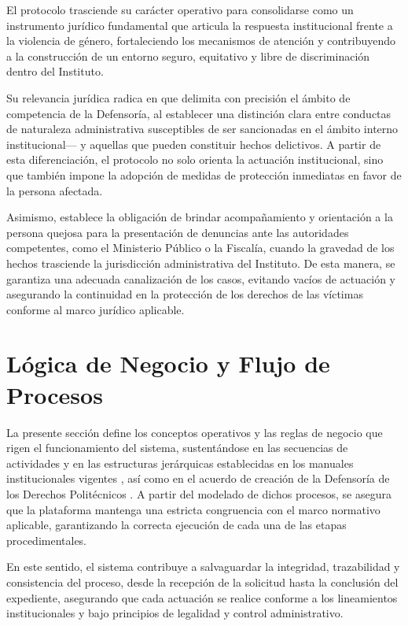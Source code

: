 El protocolo trasciende su carácter operativo para consolidarse como un instrumento jurídico fundamental que articula la respuesta institucional frente a la violencia de género, fortaleciendo los mecanismos de atención y contribuyendo a la construcción de un entorno seguro, equitativo y libre de discriminación dentro del Instituto.

Su relevancia jurídica radica en que delimita con precisión el ámbito de competencia de la Defensoría, al establecer una distinción clara entre conductas de naturaleza administrativa susceptibles de ser sancionadas en el ámbito interno institucional— y aquellas que pueden constituir hechos delictivos. A partir de esta diferenciación, el protocolo no solo orienta la actuación institucional, sino que también impone la adopción de medidas de protección inmediatas en favor de la persona afectada.

Asimismo, establece la obligación de brindar acompañamiento y orientación a la persona quejosa para la presentación de denuncias ante las autoridades competentes, como el Ministerio Público o la Fiscalía, cuando la gravedad de los hechos trasciende la jurisdicción administrativa del Instituto. De esta manera, se garantiza una adecuada canalización de los casos, evitando vacíos de actuación y asegurando la continuidad en la protección de los derechos de las víctimas conforme al marco jurídico aplicable.

\section{Lógica de Negocio y Flujo de Procesos}
La presente sección define los conceptos operativos y las reglas de negocio que rigen el funcionamiento del sistema, sustentándose en las secuencias de actividades y en las estructuras jerárquicas establecidas en los manuales institucionales vigentes \cite{4} \cite{5}, así como en el acuerdo de creación de la Defensoría de los Derechos Politécnicos \cite{3}. A partir del modelado de dichos procesos, se asegura que la plataforma mantenga una estricta congruencia con el marco normativo aplicable, garantizando la correcta ejecución de cada una de las etapas procedimentales.

En este sentido, el sistema contribuye a salvaguardar la integridad, trazabilidad y consistencia del proceso, desde la recepción de la solicitud hasta la conclusión del expediente, asegurando que cada actuación se realice conforme a los lineamientos institucionales y bajo principios de legalidad y control administrativo.

